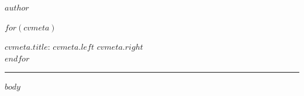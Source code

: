 \documentclass[10pt,A4]{article}
\newcommand{\metasection}[2]
{
\footnotesize{#2} \hspace*{\fill} \footnotesize{#1}\\[1pt]
}
\newcommand{\mystrut}{\rule[-.3\baselineskip]{0pt}{\baselineskip}}
\begin{document}
\pagestyle{fancy}

\vspace{-8pt}
\begin{center}
    \HUGE \textsc{\textcolor{sectcol}{$author$}}
\end{center}

\vspace{6pt}

$for(cvmeta)$
\metasection{$cvmeta.right$}{\textbf{$cvmeta.title$}: $cvmeta.left$}
$endfor$

\vspace{-2pt}
\textcolor{softcol}{\hrule}
\vspace{6pt}

\normalsize

\vspace{-6pt}
$body$


\null
\vspace*{\fill}
\hspace{-0.25\linewidth}\colorbox{white}{\makebox[1.5\linewidth][c]{\mystrut  \textnormal{\textcolor{sectcol}{$cvfooter.left$}  *  \textcolor{sectcol}{$cvfooter.right$}}}}
\end{document}
